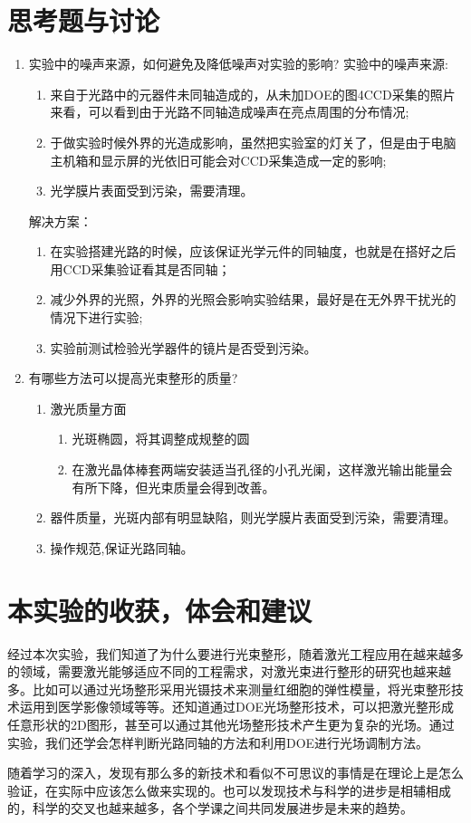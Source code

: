 \documentclass[UTF8]{ctexart}
\begin{document}
\section{ 思考题与讨论}
	\begin{enumerate}
	
\item 实验中的噪声来源，如何避免及降低噪声对实验的影响?
实验中的噪声来源:
		\begin{enumerate}
\item 来自于光路中的元器件未同轴造成的，从未加DOE的图4CCD采集的照片来看，可以看到由于光路不同轴造成噪声在亮点周围的分布情况;
\item 于做实验时候外界的光造成影响，虽然把实验室的灯关了，但是由于电脑主机箱和显示屏的光依旧可能会对CCD采集造成一定的影响;
\item  光学膜片表面受到污染，需要清理。
		\end{enumerate}
解决方案：
		\begin{enumerate}
\item 在实验搭建光路的时候，应该保证光学元件的同轴度，也就是在搭好之后用CCD采集验证看其是否同轴；
\item 减少外界的光照，外界的光照会影响实验结果，最好是在无外界干扰光的情况下进行实验;
\item 实验前测试检验光学器件的镜片是否受到污染。
		\end{enumerate}

\item 有哪些方法可以提高光束整形的质量?
	\begin{enumerate}
\item 激光质量方面
		\begin{enumerate}
			\item  光斑椭圆，将其调整成规整的圆
			\item  在激光晶体棒套两端安装适当孔径的小孔光阑，这样激光输出能量会有所下降，但光束质量会得到改善。
		\end{enumerate}
\item  器件质量，光斑内部有明显缺陷，则光学膜片表面受到污染，需要清理。
\item 操作规范,保证光路同轴。

	\end{enumerate}
	\end{enumerate}

\section{本实验的收获，体会和建议}
经过本次实验，我们知道了为什么要进行光束整形，随着激光工程应用在越来越多的领域，需要激光能够适应不同的工程需求，对激光束进行整形的研究也越来越多。比如可以通过光场整形采用光镊技术来测量红细胞的弹性模量，将光束整形技术运用到医学影像领域等等。还知道通过DOE光场整形技术，可以把激光整形成任意形状的2D图形，甚至可以通过其他光场整形技术产生更为复杂的光场。通过实验，我们还学会怎样判断光路同轴的方法和利用DOE进行光场调制方法。
	
随着学习的深入，发现有那么多的新技术和看似不可思议的事情是在理论上是怎么验证，在实际中应该怎么做来实现的。也可以发现技术与科学的进步是相辅相成的，科学的交叉也越来越多，各个学课之间共同发展进步是未来的趋势。
	
\end{document}
